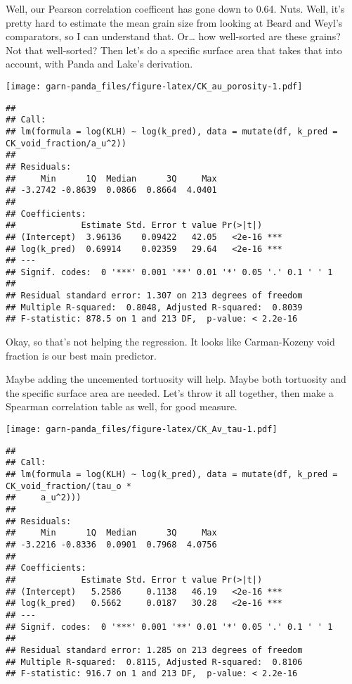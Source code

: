 \documentclass[]{article}
\begin{document}
Well, our Pearson correlation coefficent has gone down to 0.64. Nuts.
Well, it's pretty hard to estimate the mean grain size from looking at
Beard and Weyl's comparators, so I can understand that. Or\ldots{} how
well-sorted are these grains? Not that well-sorted? Then let's do a
specific surface area that takes that into account, with Panda and
Lake's derivation.

\texttt{[image: garn-panda\_files/figure-latex/CK\_au\_porosity-1.pdf]}

\begin{verbatim}
## 
## Call:
## lm(formula = log(KLH) ~ log(k_pred), data = mutate(df, k_pred = CK_void_fraction/a_u^2))
## 
## Residuals:
##     Min      1Q  Median      3Q     Max 
## -3.2742 -0.8639  0.0866  0.8664  4.0401 
## 
## Coefficients:
##             Estimate Std. Error t value Pr(>|t|)    
## (Intercept)  3.96136    0.09422   42.05   <2e-16 ***
## log(k_pred)  0.69914    0.02359   29.64   <2e-16 ***
## ---
## Signif. codes:  0 '***' 0.001 '**' 0.01 '*' 0.05 '.' 0.1 ' ' 1
## 
## Residual standard error: 1.307 on 213 degrees of freedom
## Multiple R-squared:  0.8048, Adjusted R-squared:  0.8039 
## F-statistic: 878.5 on 1 and 213 DF,  p-value: < 2.2e-16
\end{verbatim}

Okay, so that's not helping the regression. It looks like Carman-Kozeny
void fraction is our best main predictor.

Maybe adding the uncemented tortuosity will help. Maybe both tortuosity
and the specific surface area are needed. Let's throw it all together,
then make a Spearman correlation table as well, for good measure.

\texttt{[image: garn-panda\_files/figure-latex/CK\_Av\_tau-1.pdf]}

\begin{verbatim}
## 
## Call:
## lm(formula = log(KLH) ~ log(k_pred), data = mutate(df, k_pred = CK_void_fraction/(tau_o * 
##     a_u^2)))
## 
## Residuals:
##     Min      1Q  Median      3Q     Max 
## -3.2216 -0.8336  0.0901  0.7968  4.0756 
## 
## Coefficients:
##             Estimate Std. Error t value Pr(>|t|)    
## (Intercept)   5.2586     0.1138   46.19   <2e-16 ***
## log(k_pred)   0.5662     0.0187   30.28   <2e-16 ***
## ---
## Signif. codes:  0 '***' 0.001 '**' 0.01 '*' 0.05 '.' 0.1 ' ' 1
## 
## Residual standard error: 1.285 on 213 degrees of freedom
## Multiple R-squared:  0.8115, Adjusted R-squared:  0.8106 
## F-statistic: 916.7 on 1 and 213 DF,  p-value: < 2.2e-16
\end{verbatim}
\end{document}
